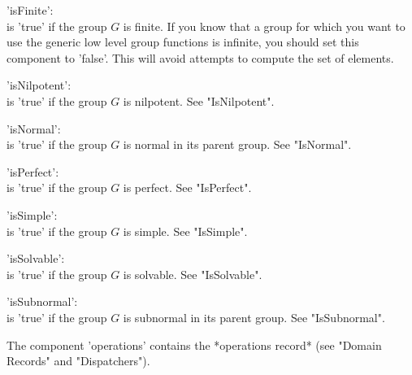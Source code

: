 'isFinite': \\
        is 'true' if the group $G$ is  finite.  If you  know that a group
        for which you want to use the generic low  level  group functions
        is  infinite, you  should   set  this component to 'false'.  This
        will avoid attempts to compute the set of elements.

'isNilpotent': \\
        is 'true' if the group $G$ is nilpotent. See "IsNilpotent".

'isNormal': \\
        is  'true' if the group  $G$ is normal in its parent group.   See
        "IsNormal".

'isPerfect': \\
        is 'true' if the group $G$ is perfect. See "IsPerfect".

'isSimple': \\
        is 'true' if the group $G$ is simple. See "IsSimple".

'isSolvable': \\
        is 'true' if the group $G$ is solvable. See "IsSolvable".

'isSubnormal': \\
        is 'true' if the group $G$ is subnormal in its  parent group. See
        "IsSubnormal".

The component 'operations' contains  the *operations record* (see "Domain
Records" and "Dispatchers").



